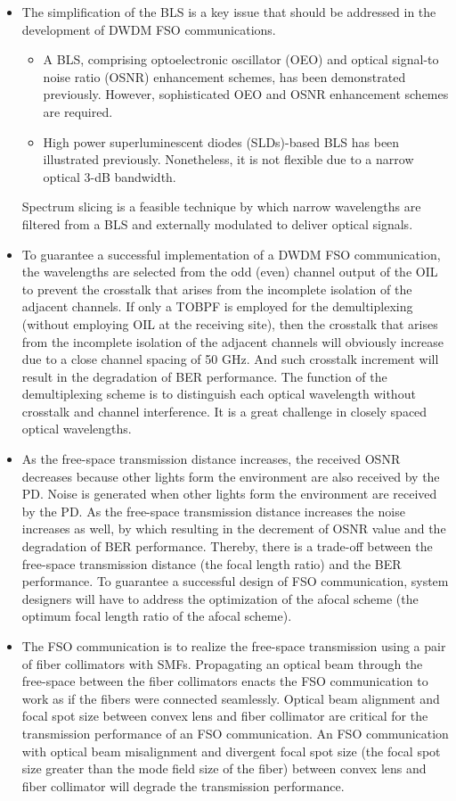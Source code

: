 \documentclass[hidelinks, 12pt]{report}
\begin{document}
\begin{itemize}
    \item The simplification of the BLS is a key issue that should be addressed in the development of DWDM
FSO communications.
\begin{itemize}
    \item A BLS, comprising optoelectronic oscillator (OEO) and optical signal-to noise
ratio (OSNR) enhancement schemes, has been demonstrated previously. However,
sophisticated OEO and OSNR enhancement schemes are required.
\item High power superluminescent
diodes (SLDs)-based BLS has been illustrated previously. Nonetheless, it is not
flexible due to a narrow optical 3-dB bandwidth.
\end{itemize}    
Spectrum slicing is a feasible technique by which
narrow wavelengths are filtered from a BLS and externally modulated to deliver optical signals. 
\item To guarantee a successful implementation of a DWDM FSO communication,
the wavelengths are selected from the odd
(even) channel output of the OIL to prevent the crosstalk that arises from the incomplete isolation
of the adjacent channels. If only a TOBPF is employed for the demultiplexing (without employing
OIL at the receiving site), then the crosstalk that arises from the incomplete isolation of the adjacent
channels will obviously increase due to a close channel spacing of 50 GHz. And such crosstalk increment
will result in the degradation of BER performance. The function of the demultiplexing
scheme is to distinguish each optical wavelength without crosstalk and channel interference. It is a
great challenge in closely spaced optical wavelengths.
\item As the free-space transmission distance
increases, the received OSNR decreases because other lights form the
environment are also received by the PD. Noise is generated when other lights form the environment
are received by the PD. As the free-space transmission distance increases the noise
increases as well, by which resulting in the decrement of OSNR value and the degradation of
BER performance. Thereby, there is a trade-off between the free-space transmission distance
(the focal length ratio) and the BER performance. To guarantee a successful design of FSO
communication, system designers will have to address the optimization of the afocal scheme
(the optimum focal length ratio of the afocal scheme).
\item The FSO communication is to realize the free-space transmission using a pair of fiber collimators
with SMFs. Propagating an optical beam through the free-space between the fiber collimators
enacts the FSO communication to work as if the fibers were connected seamlessly. Optical
beam alignment and focal spot size between convex lens and fiber collimator are critical for the
transmission performance of an FSO communication. An FSO communication with optical beam
misalignment and divergent focal spot size (the focal spot size greater than the mode field size of the fiber)
between convex lens and fiber collimator will degrade the transmission performance.
\end{itemize}
\end{document}
